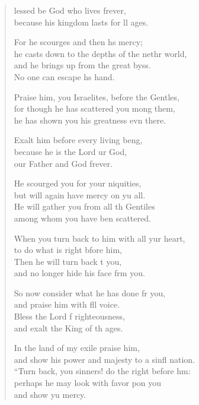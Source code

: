 \settowidth{\versewidth}{“Turn back, you sinners! do the right before him: +}
\begin{verse}%
  \begin{patverse}
    lessed be God who lives frever,\Med\\
    because his kingdom lasts for ll ages.

    For he scourges and then hs mercy;\Med\\
    he casts down to the depths of the nethr world,\\
    and he brings up from the great byss.\Med\\
    No one can escape h\pointup{\i}s hand.

    Praise him, you Israelites, before the Gent\pointup{\i}les,\Flex\\
    for though he has scattered you mong them,\Med\\
    he has shown you his greatness evn there.

    Exalt him before every living be\pointup{\i}ng,\Flex\\
    because he is the Lord ur God,\Med\\
    our Father and God frever.

    He scourged you for your \pointup{\i}niquities,\Med\\
    but will again have mercy on yu all.\\
    He will gather you from all th Gentiles\Med\\
    among whom you have ben scattered.

    When you turn back to him with all yur heart,\Med\\
    to do what is right bfore him,\\
    Then he will turn back t you,\Med\\
    and no longer hide his face frm you.

    So now consider what he has done fr you,\Med\\
    and praise him with fll voice.\\
    Bless the Lord f righteousness,\Med\\
    and exalt the King of th ages.

    In the land of my exile  praise him,\Med\\
    and show his power and majesty to a sinfl nation.\\
    “Turn back, you sinners! do the right before h\pointup{\i}m:\Flex\\
    perhaps he may look with favor pon you\Med\\
    and show yu mercy.


\end{patverse}
\end{verse}

